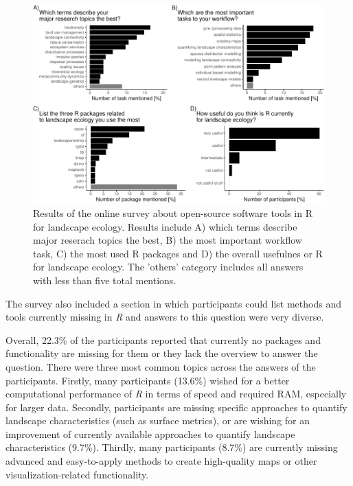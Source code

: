 \documentclass[smallextended]{svjour3}       %
\begin{document}
\begin{figure}

{\centering \includegraphics[width=1\linewidth]{paper_files/figure-latex/fig-survey-1} 

}

\caption{Results of the online survey about open-source software tools in R for landscape ecology. Results include A) which terms describe major reserach topics the best, B) the most important workflow task, C) the most used R packages and D) the overall usefulnes or R for landscape ecology. The 'others' category includes all answers with less than five total mentions.}\label{fig:fig-survey}
\end{figure}

The survey also included a section in which participants could list methods and tools currently missing in \emph{R} and answers to this question were very diverse.

Overall, 22.3\% of the participants reported that currently no packages and functionality are missing for them or they lack the overview to answer the question.
There were three most common topics across the answers of the participants.
Firstly, many participants (13.6\%) wished for a better computational performance of \emph{R} in terms of speed and required RAM, especially for larger data.
Secondly, participants are missing specific approaches to quantify landscape characteristics (such as surface metrics), or are wishing for an improvement of currently available approaches to quantify landscape characteristics (9.7\%).
Thirdly, many participants (8.7\%) are currently missing advanced and easy-to-apply methods to create high-quality maps or other visualization-related functionality.
\end{document}
